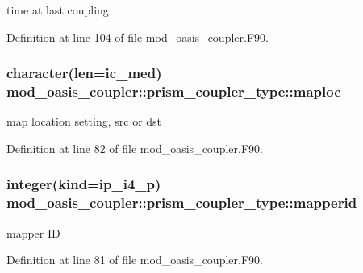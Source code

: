 time at last coupling 



Definition at line 104 of file mod\+\_\+oasis\+\_\+coupler.\+F90.

\hypertarget{structmod__oasis__coupler_1_1prism__coupler__type_aab6763e489b8ace8cff0fbe9e62cbcd8}{
\subsubsection[{maploc}]{\setlength{\rightskip}{0pt plus 5cm}character(len=ic\+\_\+med) mod\+\_\+oasis\+\_\+coupler\+::prism\+\_\+coupler\+\_\+type\+::maploc\hspace{0.3cm}{\ttfamily [private]}}}\label{structmod__oasis__coupler_1_1prism__coupler__type_aab6763e489b8ace8cff0fbe9e62cbcd8}


map location setting, src or dst 



Definition at line 82 of file mod\+\_\+oasis\+\_\+coupler.\+F90.

\hypertarget{structmod__oasis__coupler_1_1prism__coupler__type_ada880a13e931db47e72859515208ec1d}{
\subsubsection[{mapperid}]{\setlength{\rightskip}{0pt plus 5cm}integer(kind=ip\+\_\+i4\+\_\+p) mod\+\_\+oasis\+\_\+coupler\+::prism\+\_\+coupler\+\_\+type\+::mapperid\hspace{0.3cm}{\ttfamily [private]}}}\label{structmod__oasis__coupler_1_1prism__coupler__type_ada880a13e931db47e72859515208ec1d}


mapper I\+D 



Definition at line 81 of file mod\+\_\+oasis\+\_\+coupler.\+F90.

